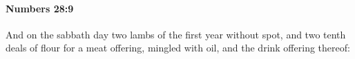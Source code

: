 
		\paragraph{Numbers 28:9} %
			\label{NUMBERS-28-9}

			And on the sabbath day two lambs of the first year without spot, and two tenth deals of flour for a meat offering, mingled with oil, and the drink offering thereof:


